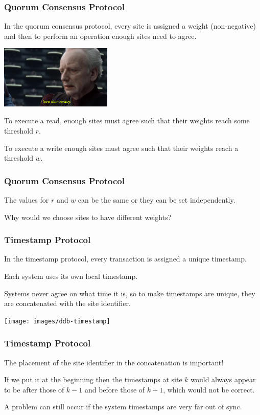\begin{frame}
\frametitle{Quorum Consensus Protocol}

In the \alert{quorum consensus protocol}, every site is assigned a weight (non-negative) and then to perform an operation enough sites need to agree. 

\begin{center}
	\includegraphics[width=0.4\textwidth]{images/democracy.jpg}
\end{center}

To execute a read, enough sites must agree such that their weights reach some threshold $r$. 

To execute a write enough sites must agree such that their weights reach a threshold $w$. 

\end{frame}



\begin{frame}
\frametitle{Quorum Consensus Protocol}

The values for $r$ and $w$ can be the same or they can be set independently.

Why would we choose sites to have different weights? 

\end{frame}

\begin{frame}
\frametitle{Timestamp Protocol}

In the timestamp protocol, every transaction is assigned a unique timestamp. 

Each system uses its own local timestamp. 

Systems never agree on what time it is, so to make timestamps are unique, they are concatenated with the site identifier.

\begin{center}
\texttt{[image: images/ddb-timestamp]}
\end{center}

\end{frame}

\begin{frame}
\frametitle{Timestamp Protocol}
The placement of the site identifier in the concatenation is important! 

If we put it at the beginning then the timestamps at site $k$ would always appear to be after those of $k-1$ and before those of $k+1$, which would not be correct. 

A problem can still occur if the system timestamps are very far out of sync.

\end{frame}

